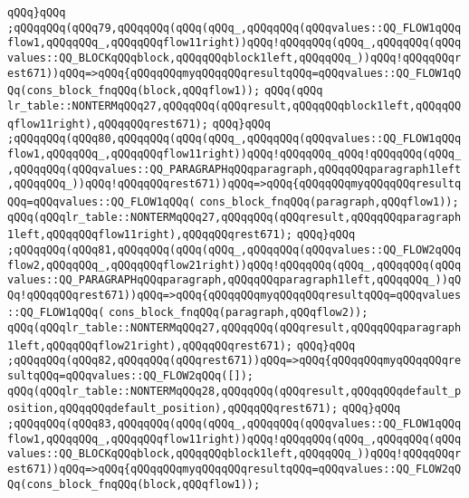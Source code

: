 \verb|qQQq}qQQq|\newline
\verb|;qQQqqQQq(qQQq79,qQQqqQQq(qQQq(qQQq_,qQQqqQQq(qQQqvalues::QQ_FLOW1qQQqflow1,qQQqqQQq_,qQQqqQQqflow11right))qQQq!qQQqqQQq(qQQq_,qQQqqQQq(qQQqvalues::QQ_BLOCKqQQqblock,qQQqqQQqblock1left,qQQqqQQq_))qQQq!qQQqqQQqrest671))qQQq=>qQQq{qQQqqQQqmyqQQqqQQqresultqQQq=qQQqvalues::QQ_FLOW1qQQq(cons_block_fnqQQq(block,qQQqflow1));|\newline
\verb|qQQq(qQQq|\newline
\verb|lr_table::NONTERMqQQq27,qQQqqQQq(qQQqresult,qQQqqQQqblock1left,qQQqqQQqflow11right),qQQqqQQqrest671);|\newline
\verb|qQQq}qQQq|\newline
\verb|;qQQqqQQq(qQQq80,qQQqqQQq(qQQq(qQQq_,qQQqqQQq(qQQqvalues::QQ_FLOW1qQQqflow1,qQQqqQQq_,qQQqqQQqflow11right))qQQq!qQQqqQQq_qQQq!qQQqqQQq(qQQq_,qQQqqQQq(qQQqvalues::QQ_PARAGRAPHqQQqparagraph,qQQqqQQqparagraph1left,qQQqqQQq_))qQQq!qQQqqQQqrest671))qQQq=>qQQq{qQQqqQQqmyqQQqqQQqresultqQQq=qQQqvalues::QQ_FLOW1qQQq(|\newline
\verb|cons_block_fnqQQq(paragraph,qQQqflow1));|\newline
\verb|qQQq(qQQqlr_table::NONTERMqQQq27,qQQqqQQq(qQQqresult,qQQqqQQqparagraph1left,qQQqqQQqflow11right),qQQqqQQqrest671);|\newline
\verb|qQQq}qQQq|\newline
\verb|;qQQqqQQq(qQQq81,qQQqqQQq(qQQq(qQQq_,qQQqqQQq(qQQqvalues::QQ_FLOW2qQQqflow2,qQQqqQQq_,qQQqqQQqflow21right))qQQq!qQQqqQQq(qQQq_,qQQqqQQq(qQQqvalues::QQ_PARAGRAPHqQQqparagraph,qQQqqQQqparagraph1left,qQQqqQQq_))qQQq!qQQqqQQqrest671))qQQq=>qQQq{qQQqqQQqmyqQQqqQQqresultqQQq=qQQqvalues::QQ_FLOW1qQQq(|\newline
\verb|cons_block_fnqQQq(paragraph,qQQqflow2));|\newline
\verb|qQQq(qQQqlr_table::NONTERMqQQq27,qQQqqQQq(qQQqresult,qQQqqQQqparagraph1left,qQQqqQQqflow21right),qQQqqQQqrest671);|\newline
\verb|qQQq}qQQq|\newline
\verb|;qQQqqQQq(qQQq82,qQQqqQQq(qQQqrest671))qQQq=>qQQq{qQQqqQQqmyqQQqqQQqresultqQQq=qQQqvalues::QQ_FLOW2qQQq([]);|\newline
\verb|qQQq(qQQqlr_table::NONTERMqQQq28,qQQqqQQq(qQQqresult,qQQqqQQqdefault_position,qQQqqQQqdefault_position),qQQqqQQqrest671);|\newline
\verb|qQQq}qQQq|\newline
\verb|;qQQqqQQq(qQQq83,qQQqqQQq(qQQq(qQQq_,qQQqqQQq(qQQqvalues::QQ_FLOW1qQQqflow1,qQQqqQQq_,qQQqqQQqflow11right))qQQq!qQQqqQQq(qQQq_,qQQqqQQq(qQQqvalues::QQ_BLOCKqQQqblock,qQQqqQQqblock1left,qQQqqQQq_))qQQq!qQQqqQQqrest671))qQQq=>qQQq{qQQqqQQqmyqQQqqQQqresultqQQq=qQQqvalues::QQ_FLOW2qQQq(cons_block_fnqQQq(block,qQQqflow1));|\newline
